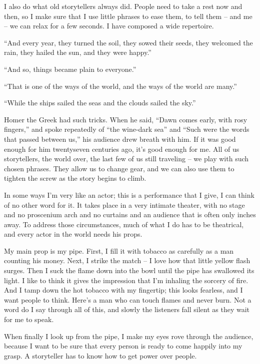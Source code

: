 \documentclass[openany]{memoir}
\begin{document}
I also do what old storytellers always did.
People need to take a rest now and then, so I make sure that I use little phrases to ease them, to tell them -- and me -- we can relax for a few seconds.
I have composed a wide repertoire.

``And every year, they turned the soil, they sowed their seeds, they welcomed the rain, they hailed the sun, and they were happy.''

``And so, things became plain to everyone.''

``That is one of the ways of the world, and the ways of the world are many.''

``While the ships sailed the seas and the clouds sailed the sky.''

Homer the Greek had such tricks.
When he said, ``Dawn comes early, with rosy fingers,'' and spoke repeatedly of ``the wine-dark sea'' and ``Such were the words that passed between us,'' his audience drew breath with him.
If it was good enough for him twentyseven centuries ago, it's good enough for me.
All of us storytellers, the world over, the last few of us still traveling -- we play with such chosen phrases.
They allow us to change gear, and we can also use them to tighten the screw as the story begins to climb.

\vspace{1em}

\noindent In some ways I'm very like an actor; this is a performance that I give, I can think of no other word for it.
It takes place in a very intimate theater, with no stage and no proscenium arch and no curtains and an audience that is often only inches away.
To address those circumstances, much of what I do has to be theatrical, and every actor in the world needs his props.

My main prop is my pipe.
First, I fill it with tobacco as carefully as a man counting his money.
Next, I strike the match -- I love how that little yellow flash surges.
Then I suck the flame down into the bowl until the pipe has swallowed its light.
I like to think it gives the impression that I'm inhaling the sorcery of fire.
And I tamp down the hot tobacco with my fingertip; this looks fearless, and I want people to think.
Here's a man who can touch flames and never burn.
Not a word do I say through all of this, and slowly the listeners fall silent as they wait for me to speak.

When finally I look up from the pipe, I make my eyes rove through the audience, because I want to be sure that every person is ready to come happily into my grasp.
A storyteller has to know how to get power over people.
\end{document}
